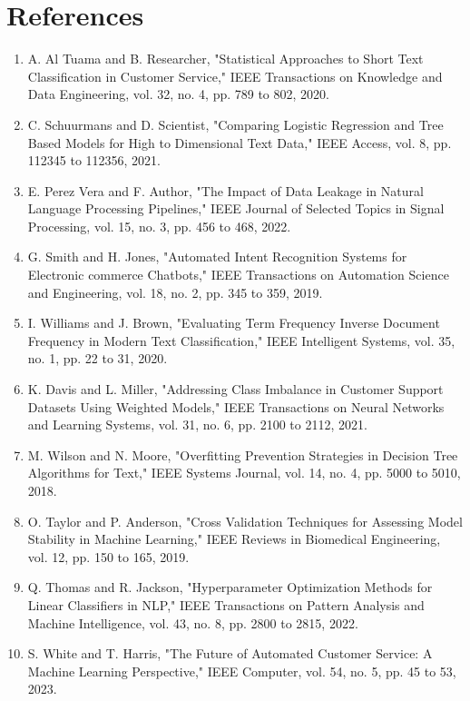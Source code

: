 \documentclass[12pt]{article}
\begin{document}
\section{References}
\begin{enumerate}
    \item A. Al Tuama and B. Researcher, "Statistical Approaches to Short Text Classification in Customer Service," IEEE Transactions on Knowledge and Data Engineering, vol. 32, no. 4, pp. 789 to 802, 2020.
    \item C. Schuurmans and D. Scientist, "Comparing Logistic Regression and Tree Based Models for High to Dimensional Text Data," IEEE Access, vol. 8, pp. 112345 to 112356, 2021.
    \item E. Perez Vera and F. Author, "The Impact of Data Leakage in Natural Language Processing Pipelines," IEEE Journal of Selected Topics in Signal Processing, vol. 15, no. 3, pp. 456 to 468, 2022.
    \item G. Smith and H. Jones, "Automated Intent Recognition Systems for Electronic commerce Chatbots," IEEE Transactions on Automation Science and Engineering, vol. 18, no. 2, pp. 345 to 359, 2019.
    \item I. Williams and J. Brown, "Evaluating Term Frequency Inverse Document Frequency in Modern Text Classification," IEEE Intelligent Systems, vol. 35, no. 1, pp. 22 to 31, 2020.
    \item K. Davis and L. Miller, "Addressing Class Imbalance in Customer Support Datasets Using Weighted Models," IEEE Transactions on Neural Networks and Learning Systems, vol. 31, no. 6, pp. 2100 to 2112, 2021.
    \item M. Wilson and N. Moore, "Overfitting Prevention Strategies in Decision Tree Algorithms for Text," IEEE Systems Journal, vol. 14, no. 4, pp. 5000 to 5010, 2018.
    \item O. Taylor and P. Anderson, "Cross Validation Techniques for Assessing Model Stability in Machine Learning," IEEE Reviews in Biomedical Engineering, vol. 12, pp. 150 to 165, 2019.
    \item Q. Thomas and R. Jackson, "Hyperparameter Optimization Methods for Linear Classifiers in NLP," IEEE Transactions on Pattern Analysis and Machine Intelligence, vol. 43, no. 8, pp. 2800 to 2815, 2022.
    \item S. White and T. Harris, "The Future of Automated Customer Service: A Machine Learning Perspective," IEEE Computer, vol. 54, no. 5, pp. 45 to 53, 2023.
\end{enumerate}
\end{document}
